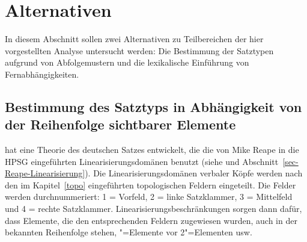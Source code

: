 

\section{Alternativen}



In diesem Abschnitt sollen zwei Alternativen zu Teilbereichen der hier vorgestellten
Analyse untersucht werden: Die Bestimmung der Satztypen aufgrund von Abfolgemustern und die
lexikalische Einführung von Fernabhängigkeiten.

\subsection{Bestimmung des Satztyps in Abhängigkeit von der Reihenfolge sichtbarer Elemente}
\label{sec-satztypen-kathol}

\mbox{}\citet{Kathol95a,Kathol97a,Kathol2000a,Kathol2001a} hat eine Theorie des deutschen
Satzes entwickelt, die die von Mike Reape in die HPSG eingeführten Linearisierungsdomänen
benutzt (siehe \citealt{Reape90a,Reape92a,Reape94a} und Abschnitt~\ref{sec-Reape-Linearisierung}).
Die Linearisierungsdomänen verbaler Köpfe werden nach den im Kapitel~\ref{topo} eingeführten topologischen Feldern
eingeteilt. Die Felder werden durchnummeriert: 1 = Vorfeld, 2 = linke Satzklammer, 3 = Mittelfeld
und 4 = rechte Satzklammer. Linearisierungsbeschränkungen sorgen dann dafür, dass Elemente,
die den entsprechenden Feldern zugewiesen wurden, auch in der bekannten Reihenfolge stehen,
"=Elemente vor 2"=Elementen usw.

